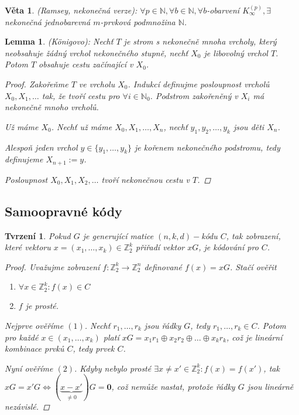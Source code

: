 \documentclass[10pt,a4paper]{article}
\newtheorem{veta}{Věta}
\newtheorem{tvrzeni}{Tvrzení}
\newtheorem{lemma}{Lemma}
\newcommand{\N}{{\mathbb{N}}}       %
\newcommand{\Z}{{\mathbb{Z}}}       %
\begin{document}
\begin{veta} (Ramsey, nekonečná verze): \normalfont
    $\forall p \in \N, \forall b \in \N, \forall b$-obarvení $K_{\infty}^{(p)}, \exists $ nekonečná jednobarevná $m$-prvková podmnožina $\N$.
\end{veta}


\begin{lemma} (Königovo): \normalfont
    Nechť $T$ je strom s nekonečně mnoha vrcholy, který neobsahuje žádný vrchol nekonečného stupně, nechť $X_0$ je libovolný vrchol $T$.
    Potom $T$ obsahuje cestu začínající v $X_0$.
    \begin{proof}
        Zakořeňme $T$ ve vrcholu $X_0$. Indukcí definujme posloupnost vrcholů $X_0, X_1, \dots$  tak, že tvoří cestu pro $\forall i \in \N_0$.
        Podstrom zakořeněný v  $X_i$ má nekonečně mnoho vrcholů. 
        
        Už máme $X_0$. Nechť už máme $X_0, X_1, \dots, X_n$, nechť $y_1, y_2, \dots, y_k$ jsou děti $X_n$.

        Alespoň jeden vrchol $y \in \{y_1, \dots, y_k\}$ je kořenem nekonečného podstromu, tedy definujeme $X_{n+1}:= y$.

        Posloupnost $X_0, X_1, X_2, \dots$ tvoří nekonečnou cestu v $T$.
    \end{proof}
\end{lemma}

\newpage
\subsection{Samoopravné kódy}

\begin{tvrzeni} \normalfont Pokud $G$ je generující matice $(n,k,d)-$kódu $C$, tak zobrazení, které vektoru $x=(x_1, \dots, x_k)\in \Z_2^k$ přiřadí vektor $xG$, je kódování pro $C$.
    \begin{proof} Uvažujme zobrazení $f:\Z_2^k \to \Z_2^n$ definované $f(x)=xG$. Stačí ověřit
        \begin{enumerate}[label=(\arabic*)]
            \item $\forall x \in \Z_2^k: f(x)\in C$
            \item $f$ je prosté.
        \end{enumerate}
        Nejprve ověříme $(1)$. Nechť $r_1, \dots, r_k$ jsou řádky $G$, tedy $r_1, \dots, r_k \in C$.
        Potom pro každé $x \in (x_1, \dots, x_k)$ platí $xG = x_1r_1 \oplus x_2r_2 \oplus \dots \oplus x_kr_k$, což je lineární kombinace prvků $C$, tedy prvek $C$.

        Nyní ověříme $(2)$. Kdyby nebylo prosté $\exists x\neq x' \in \Z_2^k: f(x)=f(x')$, tak $xG=x'G\iff (\underbrace{x-x'}_{\neq0})G=\boldsymbol{0}$, což nemůže nastat, protože řádky $G$ jsou lineárně nezávislé.
    \end{proof}
\end{tvrzeni}
\end{document}
